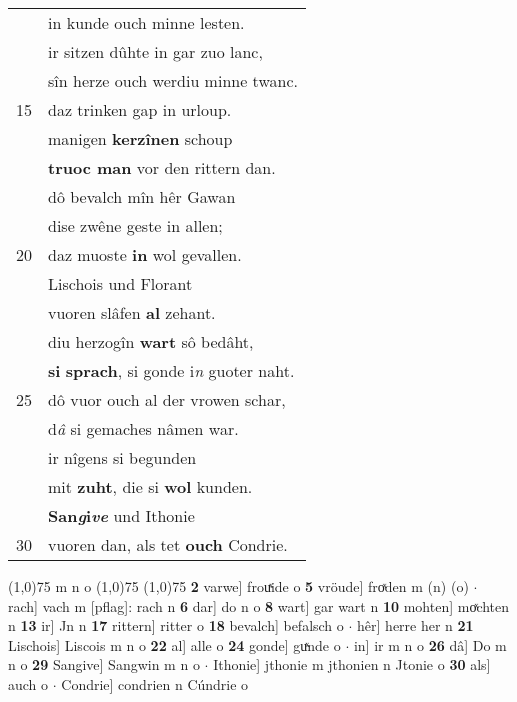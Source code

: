 \documentclass[8pt,a4paper,notitlepage]{article}
\begin{document}
\begin{table}[ht]
\begin{minipage}[t]{0.5\linewidth}
\begin{tabular}{rl}
 & in kunde ouch minne lesten.\\ 
 & ir sitzen dûhte in gar zuo lanc,\\ 
 & sîn herze ouch werdiu minne twanc.\\ 
15 & daz trinken gap in urloup.\\ 
 & manigen \textbf{kerzînen} schoup\\ 
 & \textbf{truoc man} vor den rittern dan.\\ 
 & dô bevalch mîn hêr Gawan\\ 
 & dise zwêne geste in allen;\\ 
20 & daz muoste \textbf{in} wol gevallen.\\ 
 & Lischois und Florant\\ 
 & vuoren slâfen \textbf{al} zehant.\\ 
 & diu herzogîn \textbf{wart} sô bedâht,\\ 
 & \textbf{si} \textbf{sprach}, si gonde i\textit{n} guoter naht.\\ 
25 & dô vuor ouch al der vrowen schar,\\ 
 & d\textit{â} si gemaches nâmen war.\\ 
 & ir nîgens si begunden\\ 
 & mit \textbf{zuht}, die si \textbf{wol} kunden.\\ 
 & \textbf{San\textit{g}i\textit{ve}} und Ithonie\\ 
30 & vuoren dan, als tet \textbf{ouch} Condrie.\\ 
\end{tabular}
\scriptsize
\line(1,0){75} \newline
m n o \newline
\line(1,0){75} \newline
\newline
\line(1,0){75} \newline
\textbf{2} varwe] frouͯide o \textbf{5} vröude] froͯden m (n) (o)  $\cdot$ rach] vach m [pflag]: rach n \textbf{6} dar] do n o \textbf{8} wart] gar wart n \textbf{10} mohten] moͯchten n \textbf{13} ir] Jn n \textbf{17} rittern] ritter o \textbf{18} bevalch] befalsch o  $\cdot$ hêr] herre her n \textbf{21} Lischois] Liscois m n o \textbf{22} al] alle o \textbf{24} gonde] guͯnde o  $\cdot$ in] ir m n o \textbf{26} dâ] Do m n o \textbf{29} Sangive] Sangwin m n o  $\cdot$ Ithonie] jthonie m jthonien n Jtonie o \textbf{30} als] auch o  $\cdot$ Condrie] condrien n Cúndrie o \newline
\end{minipage}
\end{table}
\end{document}

